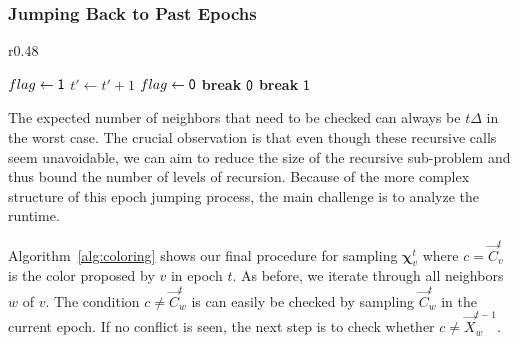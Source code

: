 \subsubsection{Jumping Back to Past Epochs}
\label{sec:jumping_back_to_past_epochs}
\begin{wrapfigure}[19]{r}{0.48\textwidth}
\vspace{-1.5em}
\begin{framed}
    \renewcommand\figurename{Algorithm}
    \caption{Generator}
    \label{alg:coloring}
    \begin{algorithmic}[1]
                    \State {}
                \EndIf
                        \State $flag\gets \mathsf{1}$
                            \State $t'\gets t' + 1$
                                \State $flag\gets \mathsf{0}$
                                \State \textbf{break}
                            \EndIf
                        \EndWhile
                            \State \Return $\mathsf{0}$
                        \EndIf
                        \State \textbf{break}
                   \EndIf
                \EndFor
            \EndFor
            \State \Return $\mathsf{1}$
        \EndProcedure
    \end{algorithmic}
\end{framed}
\end{wrapfigure}
The expected number of neighbors that need to be checked can always be $t\Delta$ in the worst case.
The crucial observation is that even though these recursive calls seem unavoidable,
we can aim to reduce the size of the recursive sub-problem and thus bound the number of levels of recursion.
Because of the more complex structure of this epoch jumping process, the main challenge is to analyze the runtime.

Algorithm~\ref{alg:coloring} shows our final procedure for sampling $\bm\chi^t_v$ where $c =\vec C^t_v$ is the color proposed by $v$ in epoch $t$.
As before, we iterate through all neighbors $w$ of $v$.
The condition $c\not=\vec C^t_w$ is can easily be checked by sampling $\vec C^t_w$ in the current epoch.
If no conflict is seen, the next step is to check whether $c\not= \vec X^{t-1}_w$.


